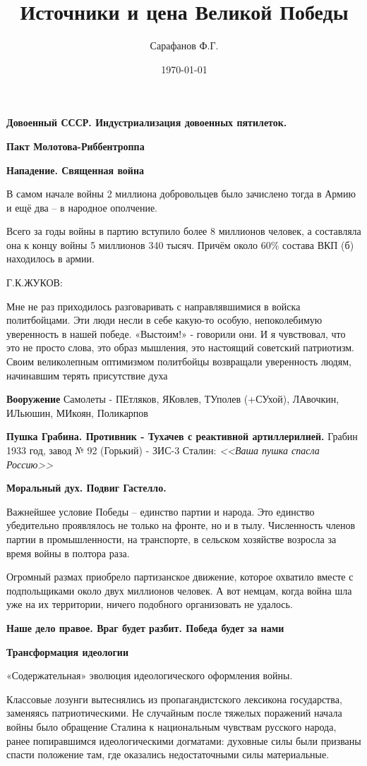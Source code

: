 \documentclass[a4paper,14pt]{extarticle}
\author{Сарафанов Ф.Г.}
\title{Источники и цена Великой Победы}
\date{\today}
\begin{document}
\maketitle

\textbf{Довоенный СССР. Индустриализация довоенных пятилеток. }

\textbf{Пакт Молотова-Риббентроппа}

\textbf{Нападение. Священная война}

В самом начале войны 2 миллиона добровольцев было зачислено тогда в Армию и ещё два – в народное ополчение.

Всего за годы войны в партию вступило более 8 миллионов человек, а составляла она к концу войны 5 миллионов 340 тысяч. Причём около 60\% состава ВКП (б) находилось в армии.

Г.К.ЖУКОВ: 

    Мне не раз приходилось разговаривать с направлявшимися в войска политбойцами. Эти люди несли в себе какую-то особую, непоколебимую уверенность в нашей победе. «Выстоим!» - говорили они. И я чувствовал, что это не просто слова, это образ мышления, это настоящий советский патриотизм. Своим великолепным оптимизмом политбойцы возвращали уверенность людям, начинавшим терять присутствие духа

\textbf{Вооружение}    Самолеты - ПЕтляков, ЯКовлев, ТУполев (+СУхой), ЛАвочкин, ИЛьюшин, МИкоян, Поликарпов 

\textbf{Пушка Грабина. Противник - Тухачев с реактивной артиллерилией.}    Грабин 1933 год, завод № 92 (Горький) - ЗИС-3
    Сталин: \textit{<<Ваша пушка спасла Россию>>}

\textbf{Моральный дух. Подвиг Гастелло. }

Важнейшее условие Победы – единство партии и народа. Это единство
убедительно проявлялось не только на фронте, но и в тылу. Численность членов партии в промышленности, на транспорте, в сельском хозяйстве возросла за время войны в полтора раза.

Огромный размах приобрело партизанское движение, которое охватило вместе с подпольщиками около двух миллионов человек. А вот немцам, когда война шла уже на их территории, ничего подобного организовать не удалось.

\textbf{Наше дело правое. Враг будет разбит. Победа будет за нами}

\textbf{Трансформация идеологии}

«Содержательная» эволюция идеологического оформления войны.

Классовые лозунги вытеснялись из пропагандистского лексикона государства, заменяясь патриотическими. Не случайным после тяжелых поражений начала войны было обращение Сталина к национальным чувствам русского народа, ранее попиравшимся идеологическими догматами: духовные силы были призваны спасти положение там, где оказались недостаточными силы материальные. 
\end{document}
